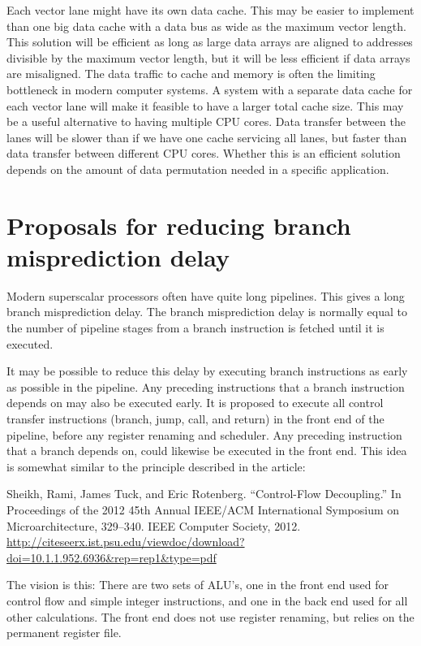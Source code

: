 \documentclass[forwardcom.tex]{subfiles}
\begin{document}
Each vector lane might have its own data cache. This may be easier to implement than one big data cache with a data bus as wide as the maximum vector length. This solution will be efficient as long as large data arrays are aligned to addresses divisible by the maximum vector length, but it will be less efficient if data arrays are misaligned. 
The data traffic to cache and memory is often the limiting bottleneck in modern computer systems. A system with a separate data cache for each vector lane will make it feasible to have a larger total cache size. This may be a useful alternative to having multiple CPU cores. Data transfer between the lanes will be slower than if we have one cache servicing all lanes, but faster than data transfer between different CPU cores. Whether this is an efficient solution depends on the amount of data permutation needed in a specific application.
\vspace{2mm}


\section{Proposals for reducing branch misprediction delay}\label{branchProposal}
Modern superscalar processors often have quite long pipelines. This gives a long branch misprediction delay. The branch misprediction delay is normally equal to the number of pipeline stages from a branch instruction is fetched until it is executed.
\vspace{2mm}

It may be possible to reduce this delay by executing branch instructions as early as possible in the pipeline. Any preceding instructions that a branch instruction depends on may also be executed early. It is proposed to execute all control transfer instructions (branch, jump, call, and return) in the front end of the pipeline, before any register renaming and scheduler. Any preceding instruction that a branch depends on, could likewise be executed in the front end. This idea is somewhat similar to the principle described in the article:

Sheikh, Rami, James Tuck, and Eric Rotenberg. “Control-Flow Decoupling.” In Proceedings of the 2012 45th Annual IEEE/ACM International Symposium on Microarchitecture, 329–340. IEEE Computer Society, 2012.
\url{http://citeseerx.ist.psu.edu/viewdoc/download?doi=10.1.1.952.6936&rep=rep1&type=pdf}
\vspace{2mm}

The vision is this: There are two sets of ALU's, one in the front end used for control flow and simple integer instructions, and one in the back end used for all other calculations. The front end does not use register renaming, but relies on the permanent register file.
\vspace{2mm}
\end{document}
